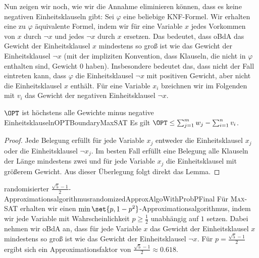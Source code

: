 \documentclass[language=ngerman,algolist]{TemplateLecture}
\begin{document}
Nun zeigen wir noch, wie wir die Annahme eliminieren können, dass es keine negativen Einheitsklauseln gibt: Sei $\varphi$ eine beliebige KNF-Formel. Wir erhalten eine zu $\varphi$ äquivalente Formel, indem wir für eine Variable $x$ jedes Vorkommen von $x$ durch $\neg x$ und jedes $\neg x$ durch $x$ ersetzen. Das bedeutet, dass oBdA das Gewicht der Einheitsklausel $x$ mindestens so groß ist wie das Gewicht der Einheitsklausel $\neg x$ (mit der impliziten Konvention, dass Klauseln, die nicht in $\varphi$ enthalten sind, Gewicht $0$ haben). Insbesondere bedeutet das, dass nicht der Fall eintreten kann, dass $\varphi$ die Einheitsklausel $\neg x$ mit positiven Gewicht, aber nicht die Einheitsklausel $x$ enthält. Für eine Variable $x_i$ bzeichnen wir im Folgenden mit $v_i$ das Gewicht der negativen Einheitsklausel $\neg x$.

\begin{lem}{$\OPT$ ist höchstens alle Gewichte minus negative Einheitsklauseln}{OPTBoundaryMaxSAT}
    Es gilt $\OPT \leq \sum_{j = 1}^m w_j - \sum_{i = 1}^n v_i$.
\end{lem}
\begin{proof}
    Jede Belegung erfüllt für jede Variable $x_j$ entweder die Einheitsklausel $x_j$ oder die Einheitsklausel $\neg x_j$. Im besten Fall erfüllt eine Belegung alle Klauseln der Länge mindestens zwei und für jede Variable $x_j$ die Einheitsklausel mit größerem Gewicht. Aus dieser Überlegung folgt direkt das Lemma.
\end{proof}

\begin{thm}{randomisierter $\frac{\sqrt{5}-1}{2}$-Approximationsalgorithmus}{randomizedApproxAlgoWithProbPFinal}
    Für \textsc{Max-SAT} erhalten wir einen $\min\set{p, 1-p^2}$-Approximationsalgorithmus, indem wir jede Variable mit Wahrscheinlichkeit $p \geq \frac{1}{2}$ unabhängig auf $1$ setzen. Dabei nehmen wir oBdA an, dass für jede Variable $x$ das Gewicht der Einheitsklausel $x$ mindestens so groß ist wie das Gewicht der Einheitsklausel $\neg x$. Für $p = \frac{\sqrt{5}-1}{2}$ ergibt sich ein Approximationsfaktor von $\frac{\sqrt{5}-1}{2} \approx 0.618$.
\end{thm}
\end{document}
